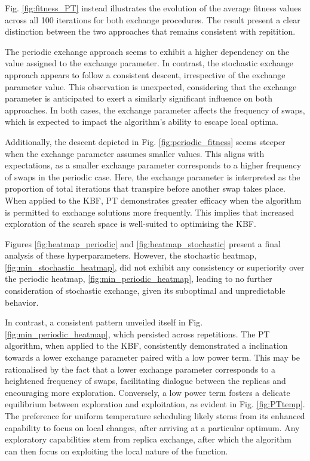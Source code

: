 \documentclass[10pt]{article}
\begin{document}
\begin{multicols}{2}
Fig. \ref {fig:fitness_PT} instead illustrates the evolution of the average fitness values across all 100 iterations for both exchange procedures. The result present a clear distinction between the two approaches that remains consistent with repitition. 

The periodic exchange approach seems to exhibit a higher dependency on the value assigned to the exchange parameter. In contrast, the stochastic exchange approach appears to follow a consistent descent, irrespective of the exchange parameter value. This observation is unexpected, considering that the exchange parameter is anticipated to exert a similarly significant influence on both approaches. In both cases, the exchange parameter affects the frequency of swaps, which is expected to impact the algorithm's ability to escape local optima.

Additionally, the descent depicted in Fig. \ref{fig:periodic_fitness} seems steeper when the exchange parameter assumes smaller values. This aligns with expectations, as a smaller exchange parameter corresponds to a higher frequency of swaps in the periodic case. Here, the exchange parameter is interpreted as the proportion of total iterations that transpire before another swap takes place. When applied to the KBF, PT demonstrates greater efficacy when the algorithm is permitted to exchange solutions more frequently. This implies that increased exploration of the search space is well-suited to optimising the KBF.

Figures \ref{fig:heatmap_periodic} and \ref{fig:heatmap_stochastic} present a final analysis of these hyperparameters. However, the stochastic heatmap, \ref{fig:min_stochastic_heatmap}, did not exhibit any consistency or superiority over the periodic heatmap, \ref{fig:min_periodic_heatmap}, leading to no further consideration of stochastic exchange, given its suboptimal and unpredictable behavior.

In contrast, a consistent pattern unveiled itself in Fig. \ref{fig:min_periodic_heatmap}, which persisted across repetitions. The PT algorithm, when applied to the KBF, consistently demonstrated a inclination towards a lower exchange parameter paired with a low power term. This may be rationalised by the fact that a lower exchange parameter corresponds to a heightened frequency of swaps, facilitating dialogue between the replicas and encouraging more exploration. Conversely, a low power term fosters a delicate equilibrium between exploration and exploitation, as evident in Fig. \ref{fig:PTtemp}. The preference for uniform temperature scheduling likely stems from its enhanced capability to focus on local changes, after arriving at a particular optimum. Any exploratory capabilities stem from replica exchange, after which the algorithm can then focus on exploiting the local nature of the function.


\end{multicols}
\end{document}
